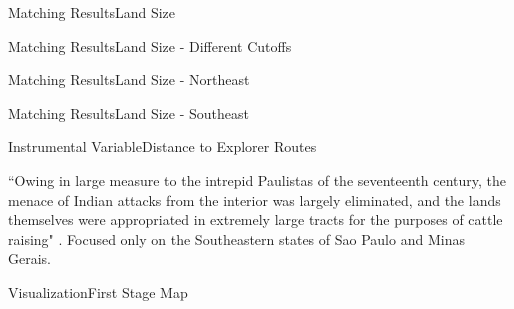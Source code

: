 \documentclass[aspectratio=1610]{beamer}
\begin{document}
\begin{frame}{Matching Results}{Land Size}
    \small
    
\end{frame}

\begin{frame}{Matching Results}{Land Size - Different Cutoffs}
    \small
    
\end{frame}


\begin{frame}{Matching Results}{Land Size - Northeast}
    \small
    
\end{frame}

\begin{frame}{Matching Results}{Land Size - Southeast}
    \small
    
\end{frame}

\begin{frame}{Instrumental Variable}{Distance to Explorer Routes}
    \begin{outline}
        \1 ``Owing in large measure to the intrepid Paulistas of the seventeenth century, the menace of Indian attacks from the interior was largely eliminated, and the lands themselves were appropriated in extremely large tracts for the purposes of cattle raising" \parencite[p.~320]{Smith1972-dv}.
        \vspace{2mm}
            \2 
        \vspace{2mm}
        \1 Focused only on the Southeastern states of Sao Paulo and Minas Gerais.
    \end{outline}
\end{frame}

\begin{frame}{Visualization}{First Stage Map}
    \begin{figure}[h!]
        \begin{center}
        \end{center}
      \end{figure}
\end{frame}
\end{document}
